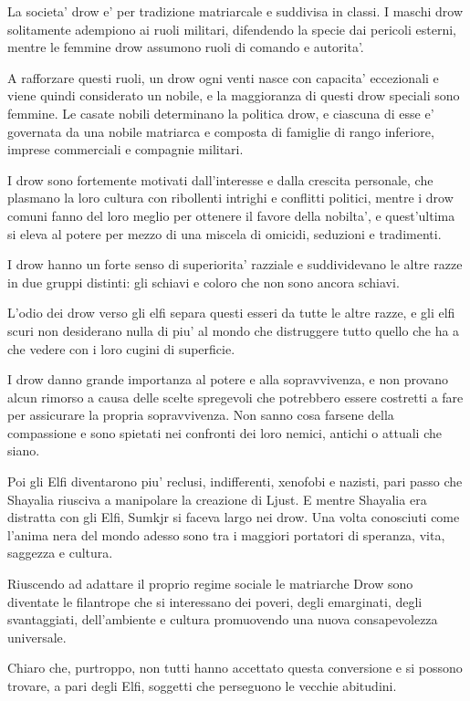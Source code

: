 \documentclass[a4paper,11pt,twoside,openany]{book}
\begin{document}
La societa' drow e' per tradizione matriarcale e suddivisa in classi. I maschi drow solitamente adempiono ai ruoli militari, difendendo la specie dai pericoli esterni, mentre le femmine drow assumono ruoli di comando e autorita'.

A rafforzare questi ruoli, un drow ogni venti nasce con capacita' eccezionali e viene quindi considerato un nobile, e la maggioranza di questi drow speciali sono femmine. Le casate nobili determinano la politica drow, e ciascuna di esse e' governata da una nobile matriarca e composta di famiglie di rango inferiore, imprese commerciali e compagnie militari.

I drow sono fortemente motivati dall'interesse e dalla crescita personale, che plasmano la loro cultura con ribollenti intrighi e conflitti politici, mentre i drow comuni fanno del loro meglio per ottenere il favore della nobilta', e quest'ultima si eleva al potere per mezzo di una miscela di omicidi, seduzioni e tradimenti.

I drow hanno un forte senso di superiorita' razziale e suddividevano le altre razze in due gruppi distinti: gli schiavi e coloro che non sono ancora schiavi.

L'odio dei drow verso gli elfi separa questi esseri da tutte le altre razze, e gli elfi scuri non desiderano nulla di piu' al mondo che distruggere tutto quello che ha a che vedere con i loro cugini di superficie.

I drow danno grande importanza al potere e alla sopravvivenza, e non provano alcun rimorso a causa delle scelte spregevoli che potrebbero essere costretti a fare per assicurare la propria sopravvivenza. Non sanno cosa farsene della compassione e sono spietati nei confronti dei loro nemici, antichi o attuali che siano.

Poi gli Elfi diventarono piu' reclusi, indifferenti, xenofobi e nazisti, pari passo che Shayalia riusciva a manipolare la creazione di Ljust. E mentre Shayalia era distratta con gli Elfi, Sumkjr si faceva largo nei drow. Una volta conosciuti come l'anima nera del mondo adesso sono tra i maggiori portatori di speranza, vita, saggezza e cultura.

Riuscendo ad adattare il proprio regime sociale le matriarche Drow sono diventate le filantrope che si interessano dei poveri, degli emarginati, degli svantaggiati, dell'ambiente e cultura promuovendo una nuova consapevolezza universale.

Chiaro che, purtroppo, non tutti hanno accettato questa conversione e si possono trovare, a pari degli Elfi, soggetti che perseguono le vecchie abitudini.
\end{document}
